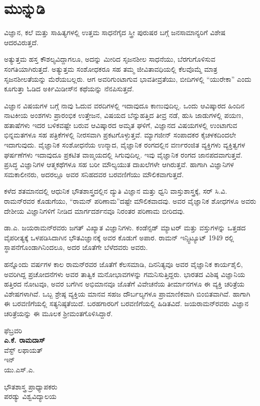 
\chapter*{ಮುನ್ನುಡಿ}

ವಿಜ್ಞಾನ, ಕಲೆ ಮತ್ತು ಸಾಹಿತ್ಯಗಳಲ್ಲಿ ಉತ್ತಮ ಸಾಧನೆಗೈದ ಸ್ತ್ರೀ ಪುರುಷರ ಬಗ್ಗೆ ಜನಸಾಮಾನ್ಯರಿಗೆ ವಿಶೇಷ ಆದರವಿರುತ್ತದೆ.

ಅತ್ಯುತ್ತಮ ಹಸ್ತ ಕೌಶಲ್ಯವಿದ್ದಾಗಲೂ, ಅದನ್ನು ಮೀರಿದ ಸೃಜನಶೀಲ ಸಾಧನೆಯು, ಬೆರಗುಗೊಳಿಸುವ ಸಂಗತಿಯಾಗಿರುತ್ತದೆ. ಅತ್ಯುತ್ತಮ ಸಂಶೋಧಕರೂ ಸಹ ತಮ್ಮ ಜೀವಿತಾವಧಿಯಲ್ಲಿ ಕೆಲವೊಮ್ಮೆ ಮಾತ್ರ ಸೃಜನಶೀಲತೆಯನ್ನು ಮೆರೆಯಬಲ್ಲರು. ಆಗ ಅವರಿಗುಂಟಾಗುವ ಭಾವತೀವ್ರತೆಯು, ಬೀದಿಗಳಲ್ಲಿ “ಯುರೇಕಾ” ಎಂದು ಕೂಗುತ್ತಾ ಓಡಿದ ಅರ್ಕಿಮಿಡೀಸ್‍ನ ಕಥೆಯನ್ನು ನೆನಪಿಸುತ್ತದೆ.

ವಿಜ್ಞಾನ ವಿಷಯಗಳ ಬಗ್ಗೆ ನಾವು ಓದುವ ವರದಿಗಳಲ್ಲಿ ಇದಾವುದೂ ಕಾಣುವುದಿಲ್ಲ. ಒಂದು ಆವಿಷ್ಕಾರದ ಹಿಂದಿನ ನಾಟಕೀಯ ಅಂಶಗಳು ಪ್ರಾರಂಭಿಕ ಉತ್ತೇಜನ, ವಿಷಯದ ಬೆನ್ನುಹತ್ತಿದ ತೀವ್ರ ನಡೆ, ಹುಸಿ ಜಾಡುಗಳಲ್ಲಿ ಪಯಣ, ಹತಾಷೆಗಳು ಇದರ ಬಳಿಕವಷ್ಟೇ ಬರುವ ಆವಿಷ್ಕಾರದ ಅಮೃತ ಘಳಿಗೆ, ವಿಜ್ಞಾನದ ವಿಷಯಗಳಲ್ಲಿ ಉಂಟಾಗುವ ಭಿನ್ನಮತಗಳೂ ಸಹ ಪತ್ರಿಕೆಗಳಲ್ಲಿ ನೀರಸವಾಗಿ ಪ್ರಕಟಗೊಳ್ಳುತ್ತವೆ. ಮ್ಯಾಗಜೀನ್ ಸಂಪಾದಕರ ಕೈಚಳಕದಿಂದಲೇ ಇದಾಗುವುದು. ವೈಜ್ಞಾನಿಕ ಸಂಶೋಧನೆಯ ಉನ್ಮಾದ, ವೈಜ್ಞಾನಿಕ ರಂಗದಲ್ಲಿನ ವರ್ಣರಂಜಿತ ವ್ಯಕ್ತಿಗಳು ವ್ಯಕ್ತಿತ್ವಗಳ ಘರ್ಷಣೆಗಳು ಇದಾವುದೂ ಪ್ರಕಟಿತ ವಾಙ್ಮಯದಲ್ಲಿ ಸಿಗುವುದಿಲ್ಲ. ಇವು ವೈಜ್ಞಾನಿಕ ರಂಗದ ಜಾನಪದವಾಗುತ್ತವೆ. ಪ್ರಸಿದ್ಧ ವಿಜ್ಞಾನಿಗಳ ಆತ್ಮಕಥೆಗಳೂ ಸಹ ಬರೀ ಮೌಲ್ಯಯುತ ದಾಖಲೆಗಳೇ ಆಗಿರುತ್ತವೆ. ಹಾಗಾಗಿ ವಿಜ್ಞಾನಿಗಳ ಸಮಕಾಲೀನರು, ಅದರಲ್ಲೂ ಅವರ ಸನಿಹದವರ ಬರವಣಿಗೆಯು ಮೌಲಿಕವಾಗುತ್ತದೆ.

ಕಳೆದ ಶತಮಾನದಲ್ಲಿ ಆಧುನಿಕ ಭೌತಶಾಸ್ತ್ರದಲ್ಲಿನ ದ್ಯುತಿ ವಿಜ್ಞಾನ ಮತ್ತು ಧ್ವನಿ ವಾಸ್ತುಶಾಸ್ತ್ರಕ್ಕೆ, ಸರ್ ಸಿ.ವಿ. ರಾಮನ್‍ರವರ ಕೊಡುಗೆಯು, “ರಾಮನ್ ಪರಿಣಾಮ”ದಷ್ಟೇ ಮೌಲಿಕವಾದವು. ಅವರ ವೈಜ್ಞಾನಿಕ ಶೋಧಗಳೂ ಅವರು ದೇಶೀಯ ವಿಜ್ಞಾನಿಗಳಿಗೆ ನೀಡಿದ ಮಾರ್ಗದರ್ಶನವೂ ನಿರಂತರ ಪರಿಣಾಮ ಬೀರಿದವು.

ಡಾ.ಎ. ಜಯರಾಮನ್‍ರವರು ಜಗತ್ ವಿಖ್ಯಾತ ವಿಜ್ಞಾನಿಗಳು. ಕಂಡೆನ್ಸಡ್ ಮ್ಯಾಟರ್ ಮತ್ತು ವಸ್ತುಗಳನ್ನು ಒತ್ತಡದ ವೈಪರೀತ್ಯಕ್ಕೆ ಒಳಪಡಿಸಿದಾಗಿನ ಭೌತವಿಜ್ಞಾನಕ್ಕೆ ಅವರ ಕೊಡುಗೆ ಅಪಾರ. ರಾಮನ್ ಇನ್ಸ್ಟಿಟ್ಯೂಟ್ 1949 ರಲ್ಲಿ ಸ್ಥಾಪನೆಗೊಂಡಾಗಿನಿಂದಲೂ, ಅದರ ಜೊತೆಗೇ ಬೆಳೆದವರು ಅವರು.

ಹನ್ನೊಂದು ವರ್ಷಗಳ ಕಾಲ ರಾಮನ್‍ರವರ ಜೊತೆಗೆ ಕೆಲಸಮಾಡಿ, ದಿನನಿತ್ಯವೂ ಅವರ ವೈಜ್ಞಾನಿಕ ಕಾರ್ಯಶೈಲಿ, ಅವರಿಗಿದ್ದ ಪ್ರಚೋದನೆಗಳು ಅವರ ತಾತ್ವಿಕ ಮನೋಭಾವಗಳನ್ನು ಗಮನಿಸುತ್ತಿದ್ದರು. ಭಾರತದ ವಿಶಿಷ್ಠ ವಿಜ್ಞಾನಿಯ ಹತ್ತಿರದ ನೋಟವೂ, ಅವರ ಬಗೆಗಿನ ಅಭಿಮಾನವೂ ಜೊತೆಗೆ ವಿವೇಚನೆಯ ತೀರ್ಮಾನಗಳೂ ಈ ವ್ಯಕ್ತಿ ಚರಿತ್ರೆಯ ವಿಶೇಷಗಳಾಗಿವೆ. ಒಬ್ಬ ಶ್ರೇಷ್ಠ ವ್ಯಕ್ತಿಯ ಮಾನವ ಸಹಜ ದೌರ್ಬಲ್ಯಗಳೂ ಪ್ರಾಮಾಣಿಕವಾಗಿ ಬಿಂಬಿತವಾಗಿವೆ. ಹಾಗಾಗಿ ಈ ಬರವಣಿಗೆಯಲ್ಲಿ ಸತ್ಯನಿಷ್ಠತೆಯಿದೆ. ಬರಹಗಾರರಿಗೆ ಬರವಣಿಗೆಯಲ್ಲಿ ಹಿಡಿತವಿದೆ. ಜಯರಾಮನ್‍ರವರು ವಿಜ್ಞಾನ ಚರಿತ್ರೆಯನ್ನು ಈ ಮೂಲಕ ಶ‍್ರೀಮಂತಗೊಳಿಸಿದ್ದಾರೆ.

\begin{flushleft}
  ಫೆಬ್ರವರಿ \\\textbf{ಎ.ಕೆ. ರಾಮದಾಸ್}\\
 ವೆಸ್ಟ್ ಲಫಾಯತ್\\
 ಇನ್ \\
 ಯು.ಎಸ್.ಎ.
\end{flushleft}

\begin{flushright}
ಭೌತಶಾಸ್ತ್ರ ಪ್ರಾಧ್ಯಾಪಕರು\\ಪರಡ್ಯು ವಿಶ್ವವಿದ್ಯಾಲಯ
\end{flushright}

